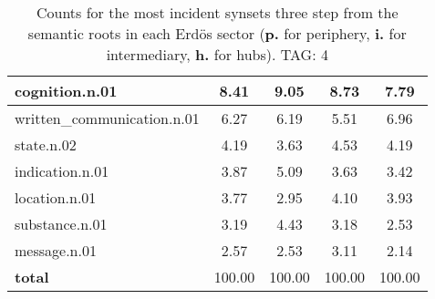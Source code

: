 \begin{table}[h!]
\begin{center}
\begin{tabular}{| l || c | c | c | c |}
cognition.n.01 & 8.41  & 9.05  & 8.73  & 7.79 \\\hline
written\_communication.n.01 & 6.27  & 6.19  & 5.51  & 6.96 \\\hline
state.n.02 & 4.19  & 3.63  & 4.53  & 4.19 \\\hline
indication.n.01 & 3.87  & 5.09  & 3.63  & 3.42 \\\hline
location.n.01 & 3.77  & 2.95  & 4.10  & 3.93 \\\hline
substance.n.01 & 3.19  & 4.43  & 3.18  & 2.53 \\\hline
message.n.01 & 2.57  & 2.53  & 3.11  & 2.14 \\\hline\hline
{{\bf total}} & 100.00  & 100.00  & 100.00  & 100.00 \\\hline
\end{tabular}
\caption{Counts for the most incident synsets three step from the semantic roots in each Erd\"os sector ({\bf p.} for periphery, {\bf i.} for intermediary, {\bf h.} for hubs). TAG: 4}
\end{center}
\end{table}